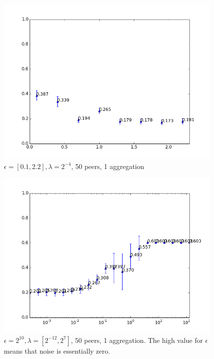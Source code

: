 \begin{figure}[h!]
	\centering
	\includegraphics[width=\textwidth]{fig/eps0.1-2.2,bud=eps,peers50,groups50,reg2e-4}
	\caption{$\epsilon = [0.1, 2.2], \lambda = 2^{-4}$, 50 peers, 1 aggregation}
	\label{fig:linear_epsilon_range}
\end{figure}

\begin{figure}[h!]
	\centering
	\includegraphics[width=\textwidth]{fig/eps2e10.0,bud2e10.0,peers10,groups5,reg2e-12-2e7}
	\caption{$\epsilon = 2^{10}, \lambda = [2^{-12}, 2^{7}]$, 50 peers, 1 aggregation. The high value for $\epsilon$ means that noise is essentially zero.}
	\label{fig:regularization_extremelyhighepsilon}
\end{figure}

